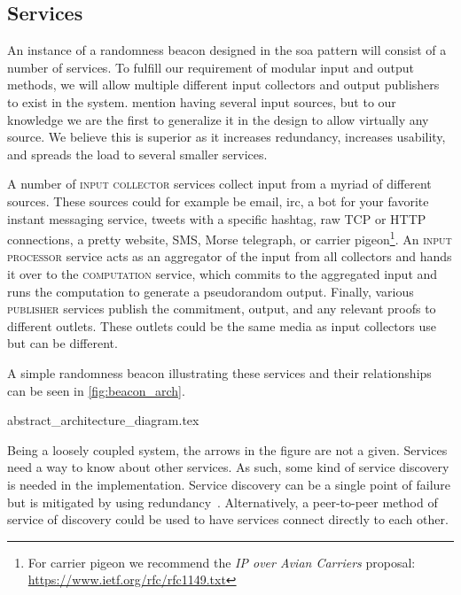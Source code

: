 \subsection{Services}%
\label{sub:components_of_a_beacon}

An instance of a randomness beacon designed in the \gls{soa} pattern will consist of a number of services.
To fulfill our requirement of modular input and output methods, we will allow multiple different input collectors and output publishers to exist in the system. \citet{randomzoo} mention having several input sources, but to our knowledge we are the first to generalize it in the design to allow virtually any source.
We believe this is superior as it increases redundancy, increases usability, and spreads the load to several smaller services.

A number of \textsc{input collector} services collect input from a myriad of different sources.
These sources could for example be email, irc, a bot for your favorite instant messaging service, tweets with a specific hashtag, raw TCP or HTTP connections, a pretty website, SMS, Morse telegraph, or carrier pigeon\footnote{For carrier pigeon we recommend the \emph{IP over Avian Carriers} proposal: \url{https://www.ietf.org/rfc/rfc1149.txt}}.
An \textsc{input processor} service acts as an aggregator of the input from all collectors and hands it over to the \textsc{computation} service, which commits to the aggregated input and runs the computation to generate a pseudorandom output.
Finally, various \textsc{publisher} services publish the commitment, output, and any relevant proofs to different outlets.
These outlets could be the same media as input collectors use but can be different.

A simple randomness beacon illustrating these services and their relationships can be seen in \cref{fig:beacon_arch}.

{abstract_architecture_diagram.tex}

Being a loosely coupled system, the arrows in the figure are not a given.
Services need a way to know about other services.
As such, some kind of service discovery is needed in the implementation.
Service discovery can be a single point of failure but is mitigated by using redundancy~\cite{soa_redundancy}.
Alternatively, a peer-to-peer method of service of discovery could be used to have services connect directly to each other.

